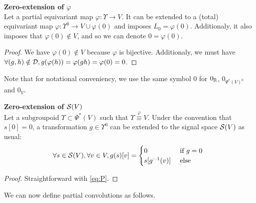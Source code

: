 \begin{lemma}\textbf{Zero-extension of $\varphi$}\\
Let a partial equivariant map $\varphi: \Upsilon \rightarrow V$. It can be extended to a (total) equivariant map $\varphi: \Upsilon^0 \rightarrow V \cup \varphi(0)$ and imposes $L_0 = \varphi(0)$. Additionaly, it also imposes that $\varphi(0) \notin V$, and so we can denote $0 =\varphi(0)$.
\end{lemma}
\begin{proof}
We have $\varphi(0) \notin V$ because $\varphi$ is bijective. Additionaly, we must have $\forall (g,h) \notin \mathcal{D}, g(\varphi(h)) = \varphi(gh) = \varphi(0) = 0$.
\end{proof}

\begin{remark} Note that for notational conveniency, we use the same symbol $0$ for $0_{\mathbb{R}}$, $0_{\Psi^*(V)^0}$ and $0_V$.
\end{remark}

\begin{lemma}\textbf{Zero-extension of $\mathcal{S}(V)$}\\
Let a subgroupoid $\Upsilon \subset \Psi^*(V)$ such that $\Upsilon \overset\varphi\equiv V$. Under the convention that $s[0] = 0$, a transformation $g \in \Upsilon^0$ can be extended to the signal space $\mathcal{S}(V)$ as usual:
\begin{gather*}
\forall s \in \cs(V), \forall v \in V, g(s)[v] =
  \begin{cases}
    0 &\text{ if } g = 0\\
    s[g^{-1}(v)]%
      &\text{ else}
  \end{cases}
\end{gather*}
\end{lemma}
\begin{proof}
Straightforward with \eqref{eq:P}.
\end{proof}

We can now define partial convolutions as follows.

\todo{}


